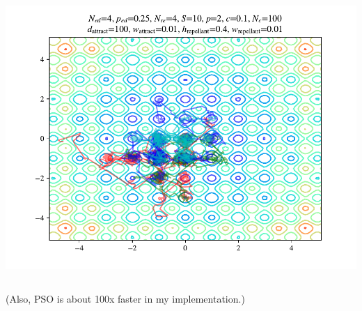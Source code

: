 \documentclass{beamer}
\begin{document}
\begin{frame}
\begin{columns}[T]
\begin{center}
    \includegraphics[scale=0.3]{assets/rastrigin_colony_ed_1_theta}
  \end{center}
\end{columns}
(Also, PSO is about 100x faster in my implementation.)
\end{frame}
\end{document}
